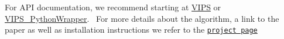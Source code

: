For A\+PI documentation, we recommend starting at \hyperlink{classVIPS}{V\+I\+PS} or \hyperlink{classVIPS__PythonWrapper}{V\+I\+P\+S\+\_\+\+Python\+Wrapper}.~\newline
 For more details about the algorithm, a link to the paper as well as installation instructions we refer to the \href{https://github.com/OlegArenz/VIPS}{\tt project page} 